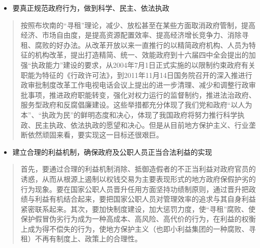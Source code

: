 \documentclass[11pt]{article}
\begin{document}
\begin{itemize}
\item 要真正规范政府行为，做到科学、民主、依法执政
\end{itemize}
\begin{quote}
按照布坎南的“寻租”理论，减少、放松甚至在某些方面取消政府管制，提高经济、市场自由度，是提高资源配置效率、提高经济增长竞争力、消除寻租、腐败的好办法。从改革开放以来一直推行的以精简政府机构、人员为特征的机构改革，提出打造精简、统一、效能政府到十六届四中全会提出的加强“执政能力”建设的要求，从2004年7月1日正式实施的以限制约束政府有关职能为特征的《行政许可法》，到2011年11月14日国务院召开的深入推进行政审批制度改革工作电视电话会议上提出的进一步清理、减少和调整行政审批事项，推进政府职能转变，强化对权力运行的监督制约，推进法治政府、服务型政府和反腐倡廉建设。这些举措都充分体现了我们党和政府“以人为本”、“执政为民”的鲜明态度和决心，体现了我国政府将努力推行科学执政、民主执政、依法执政的愿望和决心。但是从目前地方保护主义、行业垄断依然顽固来看，要实现这一目标还很艰巨。
\end{quote}
\begin{itemize}
\item 建立合理的利益机制，确保政府及公职人员正当合法利益的实现
\end{itemize}
\begin{quote}
首先，要通过合理的利益机制消除、抵御造假者的不正当利益对政府官员的诱惑，从而从根源上遏制以权钱交易为主要表现形式的地方政府保假护劣的行为现象。要在国家公职人员晋升任用方面坚持功绩制原则，通过晋升把政绩与利益有机结合起来，要把国家公职人员对管理效率的追求与其自身利益紧密联系起来。其次，要加快制度建设，加大惩罚力度，使“寻租”腐败、使保护假冒伪劣行为成为一种高成本、高风险、高代价的行为，在利益的权衡上成为得不偿失的行为，使地方保护主义（也即小利益集团的一种腐败、寻租）不再有制度上、政策上的合理性。
\end{quote}
\end{document}
